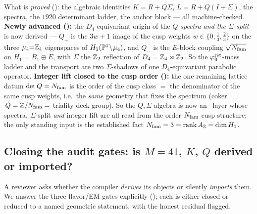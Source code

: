 \begin{gapbox}
What is \emph{proved} (\mE): the algebraic identities $K=R+Q\Sigma$, $L=R+Q(I+\Sigma)$, the spectra, the
$1920$ determinant ladder, the anchor block --- all machine-checked. \textbf{Newly advanced ():}
the $D_4$-equivariant origin of the \emph{$Q$-spectra and the $\Sigma$-split} is now derived --- $Q_+$ is the
$3w{+}1$ image of the cusp weights $w\in\{0,\tfrac13,\tfrac23\}$ on the three $\mu_4{=}\mathbb{Z}_4$ eigenspaces of
$H_1(\mathbb{P}^1\!\setminus\!\mu_4)$, and $Q_-$ is the $E$-block coupling $\sqrt{N_{\mathrm{fam}}}$ on $H_1=B_1\oplus E$, with
$\Sigma$ the $\mathbb{Z}_2$ reflection of $D_4=\mathbb{Z}_4\rtimes\mathbb{Z}_2$. So the $\varphi_0^{\mathrm{ret}}$-mass ladder and the transport are two
$\Sigma$-shadows of one $D_4$-equivariant parabolic operator. \textbf{Integer lift closed to the cusp order
():} the one remaining lattice datum $\det Q=N_{\mathrm{fam}}$ is the order of the cusp
class $=$ the denominator of the same cusp weights, i.e.\ the \emph{same} geometry that fixes the spectrum
(coker$\,Q=\mathbb{Z}/N_{\mathrm{fam}}=$ triality deck group). So the $Q,\Sigma$ algebra is now an \mE\ layer whose spectra,
$\Sigma$-split \emph{and} integer lift are all read from the order-$N_{\mathrm{fam}}$ cusp structure; the only standing
input is the established fact $N_{\mathrm{fam}}=3=\operatorname{rank}A_3=\dim H_1$.
\end{gapbox}

\subsection{Closing the audit gates: is $M{=}41$, $K$, $Q$ derived or imported?}
A reviewer asks whether the compiler \emph{derives} its objects or silently
\emph{imports} them. We answer the three flavor/EM gates explicitly
(); each is either closed or reduced to a named
geometric statement, with the honest residual flagged.

